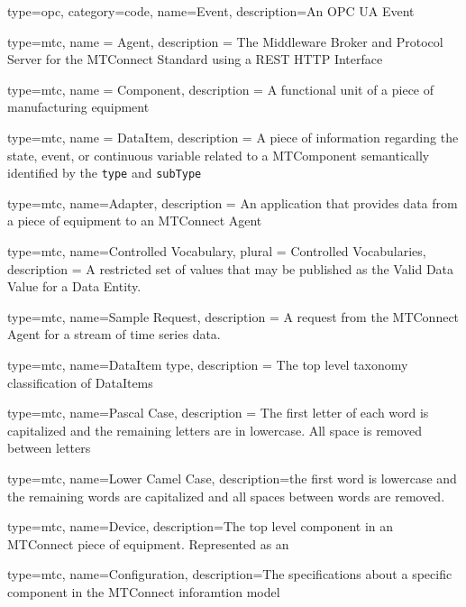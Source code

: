 {
  type=opc,
  category=code,
  name=Event,
  description={An OPC UA Event}
}



{
  type=mtc,
  name = {Agent},
  description = {The Middleware Broker and Protocol Server for the MTConnect Standard using a REST HTTP Interface}
}

{
  type=mtc,
  name = Component,
  description = {A functional unit of a piece of manufacturing equipment}
}

{
  type=mtc,
  name = DataItem,
  description = {A piece of information regarding the state, event, or continuous variable related to a \gls{MTComponent} semantically identified by the \texttt{type} and \texttt{subType}}
}

{
  type=mtc,
  name=Adapter,
  description = {An application that provides data from a piece of equipment to an MTConnect Agent}
}

{
  type=mtc,
  name={Controlled Vocabulary},
  plural = {Controlled Vocabularies},
  description = {A restricted set of values that may be published as the Valid Data Value for a Data Entity.}
}

{
  type=mtc,
  name={Sample Request},
  description = {A request from the MTConnect \gls{Agent} for a stream of time series data.}
}

{
  type=mtc,
  name={DataItem type},
  description = {The top level taxonomy classification of \glspl{DataItem}}
}

{
  type=mtc,
  name={Pascal Case},
  description = {The first letter of each word is capitalized and the remaining letters are in lowercase. All space is removed between letters}
}

{
  type=mtc,
  name={Lower Camel Case},
  description={the first word is lowercase and the remaining words are capitalized and all spaces between words are removed.}
}


{
  type=mtc,
  name=Device,
  description={The top level component in an MTConnect piece of equipment. Represented as an }
}

{
  type=mtc,
  name=Configuration,
  description={The specifications about a specific component in the MTConnect inforamtion model}
}


